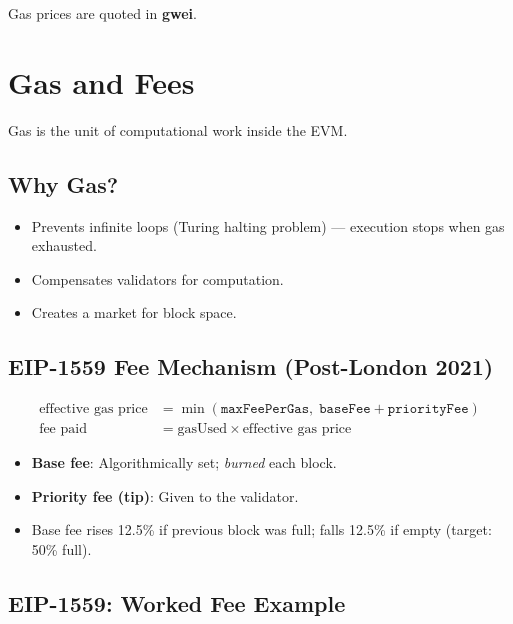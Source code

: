 \documentclass[12pt,a4paper,openany]{book}
\theoremstyle{definition}
\theoremstyle{plain}
\theoremstyle{remark}
\begin{document}
Gas prices are quoted in \textbf{gwei}.

\section{Gas and Fees}

Gas is the unit of computational work inside the EVM.

\subsection{Why Gas?}

\begin{itemize}
  \item Prevents infinite loops (Turing halting problem) — execution stops
        when gas exhausted.
  \item Compensates validators for computation.
  \item Creates a market for block space.
\end{itemize}

\subsection{EIP-1559 Fee Mechanism (Post-London 2021)}

\begin{align}
  \text{effective gas price} &= \min(\texttt{maxFeePerGas},\;
    \texttt{baseFee}+\texttt{priorityFee}) \\
  \text{fee paid} &= \text{gasUsed}\times\text{effective gas price}
\end{align}

\begin{itemize}
  \item \textbf{Base fee}: Algorithmically set; \emph{burned} each block.
  \item \textbf{Priority fee (tip)}: Given to the validator.
  \item Base fee rises 12.5\% if previous block was full; falls 12.5\% if
        empty (target: 50\% full).
\end{itemize}

\subsection{EIP-1559: Worked Fee Example}
\end{document}
